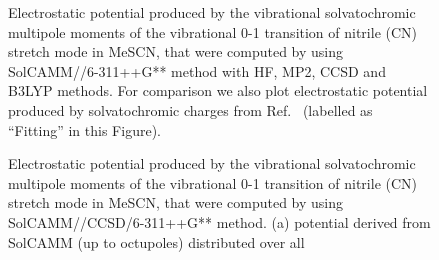 \documentclass[b5paper,oneside,fleqn,11pt]{book}
\begin{document}
\begin{refsection}
%
\begin{figure}[t!]
\centering
\setlength\fboxsep{0.4pt}
\setlength\fboxrule{0.5pt}
\caption{
Electrostatic potential produced by the vibrational solvatochromic multipole moments of the vibrational 0-1
transition of nitrile (CN) stretch mode in MeSCN, that were computed by using 
SolCAMM//6-311++G** method with HF, MP2, CCSD and B3LYP methods. For comparison
we also plot electrostatic potential produced by solvatochromic charges 
from Ref.~\citep{Lee.Choi.Cho.JCP.2012} (labelled as ``Fitting'' in this Figure).
\label{f:mescn-maps-all}}
\end{figure}
%
%
\begin{figure}[t!]
\centering
\setlength\fboxsep{0.4pt}
\setlength\fboxrule{0.5pt}
\caption{
Electrostatic potential produced by the vibrational solvatochromic multipole moments of the vibrational 0-1
transition of nitrile (CN) stretch mode in MeSCN, that were computed by using 
SolCAMM//CCSD/6-311++G** method. (a) potential derived from SolCAMM (up to octupoles) distributed over all 
}
\end{figure}
\end{refsection}
\end{document}
